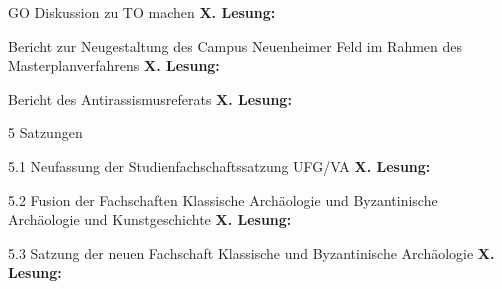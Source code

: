 GO Diskussion zu TO machen
\textbf{X. Lesung:}
\ul{
}

 Bericht zur Neugestaltung des Campus Neuenheimer Feld im Rahmen des Masterplanverfahrens
\textbf{X. Lesung:}
\ul{
}

Bericht des Antirassismusreferats
\textbf{X. Lesung:}
\ul{
}

5 Satzungen

5.1 Neufassung der Studienfachschaftssatzung UFG/VA
\textbf{X. Lesung:}
\ul{
}

5.2 Fusion der Fachschaften Klassische Archäologie und Byzantinische Archäologie und Kunstgeschichte
\textbf{X. Lesung:}
\ul{
}

5.3 Satzung der neuen Fachschaft Klassische und Byzantinische Archäologie 
\textbf{X. Lesung:}
\ul{
}

